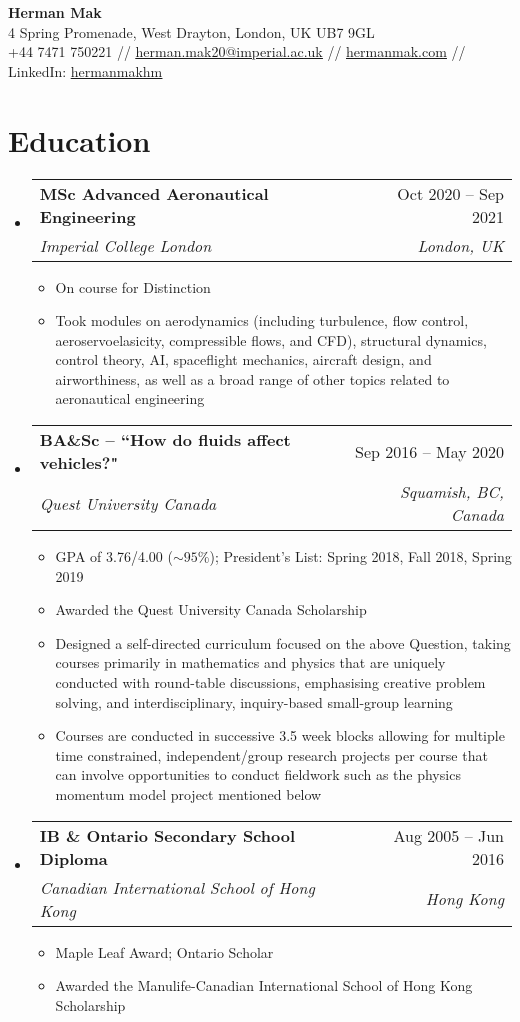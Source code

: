 \documentclass[a4paper,11pt]{article}
\makeatletter
\newcommand{\resumeItem}[1]{
  \item\small{
    {#1\vspace{-2pt}}
  }
}
\newcommand{\resumeSubheading}[4]{
  \vspace{-2pt}\item
    \begin{tabular*}{0.97\textwidth}[t]{l@{\extracolsep{\fill}}r}
      \textbf{#1} & #2 \\
      \textit{\small#3} & \textit{\small #4} \\
    \end{tabular*}\vspace{-7pt}
}
\newcommand{\resumeSubHeadingListStart}{\begin{itemize}[leftmargin=0.15in, label={}]}
\newcommand{\resumeSubHeadingListEnd}{\end{itemize}}
\newcommand{\resumeItemListStart}{\begin{itemize}}
\newcommand{\resumeItemListEnd}{\end{itemize}\vspace{-5pt}}
\makeatother
\begin{document}
\begin{center}
    \textbf{\Large Herman Mak} \\ \vspace{1pt}
    4 Spring Promenade, West Drayton, London, UK UB7 9GL\\
    \small +44 7471 750221 // \href{mailto:herman.mak20@imperial.ac.uk}{\underline{herman.mak20@imperial.ac.uk}} //
\href{https://hermanmak.com/}{\underline{hermanmak.com}} //
    LinkedIn: \href{https://www.linkedin.com/in/hermanmakhm/}{\underline{hermanmakhm}}
\end{center}

\section{Education}
  \resumeSubHeadingListStart
    \resumeSubheading
      {MSc Advanced Aeronautical Engineering}{Oct 2020 -- Sep 2021}
      {Imperial College London}{London, UK}
        \resumeItemListStart
        \resumeItem{On course for Distinction}
        \resumeItem{Took modules on aerodynamics (including turbulence, flow control, aeroservoelasicity, compressible flows, and CFD), structural dynamics, control theory, AI, spaceflight mechanics, aircraft design, and airworthiness, as well as a broad range of other topics related to aeronautical engineering} 
      \resumeItemListEnd
    \resumeSubheading
      {BA\&Sc -- ``How do fluids affect vehicles?"}{Sep 2016 -- May 2020}
      {Quest University Canada}{Squamish, BC, Canada}
      \resumeItemListStart
      	\resumeItem{GPA of 3.76/4.00 ($\sim95$\%); President's List: Spring 2018, Fall 2018, Spring 2019}
      	\resumeItem{Awarded the Quest University Canada Scholarship}
        \resumeItem{Designed a self-directed curriculum focused on the above Question, taking courses primarily in mathematics and physics that are uniquely conducted with round-table discussions, emphasising creative problem solving, and interdisciplinary, inquiry-based small-group learning}
        \resumeItem{Courses are conducted in successive 3.5 week blocks allowing for multiple time constrained, independent/group research projects per course that can involve opportunities to conduct fieldwork such as the physics momentum model project mentioned below}
      \resumeItemListEnd
    \resumeSubheading
      {IB \& Ontario Secondary School Diploma}{Aug 2005 -- Jun 2016}
      {Canadian International School of Hong Kong}{Hong Kong}
      \resumeItemListStart
        \resumeItem{Maple Leaf Award; Ontario Scholar}
        \resumeItem{Awarded the Manulife-Canadian International School of Hong Kong Scholarship}
      \resumeItemListEnd
  \resumeSubHeadingListEnd
\end{document}
